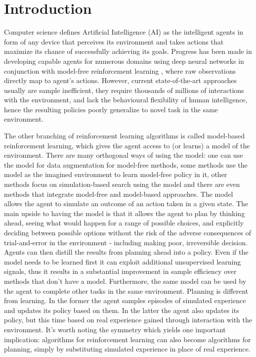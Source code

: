 \section{Introduction}

Computer science defines Artificial Intelligence (AI) as the intelligent agents in form of any device that perceives its environment and takes actions that maximize its chance of successfully achieving its goals. Progress has been made in developing capable agents for numerous domains using deep neural networks in conjunction with model-free reinforcement learning \cite{Algo.Rainbow}\cite{Algo.A3C}\cite{Algo.PPO}, where raw observations directly map to agent's actions. However, current state-of-the-art approaches usually are sample inefficient, they require thousands of millions of interactions with the environment, and lack the behavioural flexibility of human intelligence, hence the resulting policies poorly generalize to novel task in the same environment.

The other branching of reinforcement learning algorithms is called model-based reinforcement learning, which gives the agent access to (or learns) a model of the environment. There are many orthogonal ways of using the model: one can use the model for data augmentation for model-free methods\cite{Algo.MBVE}, some methods use the model as the imagined environment to learn model-free policy in it\cite{Algo.WorldModels}, other methods focus on simulation-based search using the model\cite{Algo.AlphaZero} and there are even methods that integrate model-free and model-based approaches\cite{Algo.I2A}. The model allows the agent to simulate an outcome of an action taken in a given state. The main upside to having the model is that it allows the agent to plan by thinking ahead, seeing what would happen for a range of possible choices, and explicitly deciding between possible options without the risk of the adverse consequences of trial-and-error in the environment - including making poor, irreversible decision. Agents can then distill the results from planning ahead into a policy. Even if the model needs to be learned first it can exploit additional unsupervised learning signals, thus it results in a substantial improvement in sample efficiency over methods that don’t have a model. Furthermore, the same model can be used by the agent to complete other tasks in the same environment.
Planning is different from learning. In the former the agent samples episodes of simulated experience and updates its policy based on them. In the latter the agent also updates its policy, but this time based on real experience gained through interaction with the environment. It's worth noting the symmetry which yields one important implication: algorithms for reinforcement learning can also become algorithms for planning, simply by substituting simulated experience in place of real experience.

